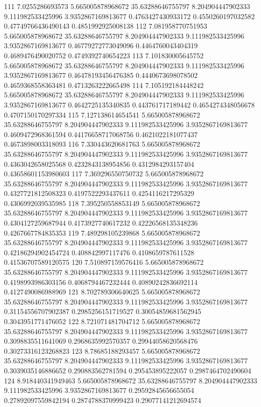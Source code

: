 {111 7.0255286693573 5.665005878968672 35.63288646755797 8.204904447902333 9.111982533425996 3.9352867169813677 0.4763427430933172 0.4550260197032582 0.47749766436490143 0.4851992925008138
112 7.081958770751953 5.665005878968672 35.63288646755797 8.204904447902333 9.111982533425996 3.9352867169813677 0.46779272773049096 0.4464760043404319 0.4689476490020752 0.4749392740654223
113 7.101830005645752 5.665005878968672 35.63288646755797 8.204904447902333 9.111982533425996 3.9352867169813677 0.46478193456476385 0.4440673698078502 0.4659368558363481 0.4713263222665498
114 7.105192184448242 5.665005878968672 35.63288646755797 8.204904447902333 9.111982533425996 3.9352867169813677 0.4642725135340835 0.443761717189442 0.4654274348056678 0.4707150170297334
115 7.127138614654541 5.665005878968672 35.63288646755797 8.204904447902333 9.111982533425996 3.9352867169813677 0.4609472968361594 0.44176658717068756 0.4621022181077437 0.4673898003318093
116 7.330443620681763 5.665005878968672 35.63288646755797 8.204904447902333 9.111982533425996 3.9352867169813677 0.4363042658025568 0.4232843138954856 0.4312984293157404 0.43658601153980603
117 7.369296550750732 5.665005878968672 35.63288646755797 8.204904447902333 9.111982533425996 3.9352867169813677 0.4327721812508323 0.4197522293437611 0.4254116217295329 0.4306992039535985
118 7.395250558853149 5.665005878968672 35.63288646755797 8.204904447902333 9.111982533425996 3.9352867169813677 0.4304127259687944 0.4173927740617232 0.42226568135348236 0.4267667784835353
119 7.489298105239868 5.665005878968672 35.63288646755797 8.204904447902333 9.111982533425996 3.9352867169813677 0.42186294902454724 0.408842997117476 0.4108659787611528 0.41536707589120575
120 7.510897159576416 5.665005878968672 35.63288646755797 8.204904447902333 9.111982533425996 3.9352867169813677 0.4198993986303156 0.4068794467232444 0.40890242836692114 0.4127490086988969
121 8.702789306640625 5.665005878968672 35.63288646755797 8.204904447902333 9.111982533425996 3.9352867169813677 0.31154556707902387 0.2985256151719527 0.30054859681562945 0.3043951771476052
122 8.721071481704712 5.665005878968672 35.63288646755797 8.204904447902333 9.111982533425996 3.9352867169813677 0.3098835511641069 0.2968635992570357 0.29944058620568476 0.30273316123268823
123 8.78685188293457 5.665005878968672 35.63288646755797 8.204904447902333 9.111982533425996 3.9352867169813677 0.3039035146886652 0.290883562781594 0.295453895222057 0.2987464702490604
124 8.918440341949463 5.665005878968672 35.63288646755797 8.204904447902333 9.111982533425996 3.9352867169813677 0.29592845656655054 0.27892097559842194 0.2874788370999423 0.29077141212694574
}
